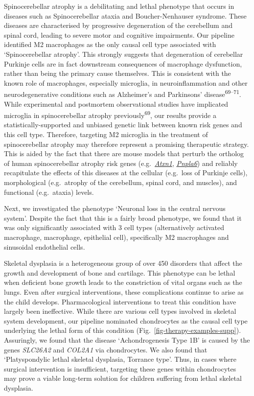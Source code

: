 \documentclass[
]{article}
\begin{document}
Spinocerebellar atrophy is a debilitating and lethal phenotype that
occurs in diseases such as Spinocerebellar ataxia and Boucher-Nenhauser
syndrome. These diseases are characterised by progressive degeneration
of the cerebellum and spinal cord, leading to severe motor and cognitive
impairments. Our pipeline identified M2 macrophages as the only causal
cell type associated with `Spinocerebellar atrophy'. This strongly
suggests that degeneration of cerebellar Purkinje cells are in fact
downstream consequences of macrophage dysfunction, rather than being the
primary cause themselves. This is consistent with the known role of
macrophages, especially microglia, in neuroinflammation and other
neurodegenerative conditions such as Alzheimer's and Parkinsons'
disease\textsuperscript{69--71}. While experimental and postmortem
observational studies have implicated microglia in spinocerebellar
atrophy previously\textsuperscript{69}, our results provide a
statistically-supported and unbiased genetic link between known risk
genes and this cell type. Therefore, targeting M2 microglia in the
treatment of spinocerebellar atrophy may therefore represent a promising
therapeutic strategy. This is aided by the fact that there are mouse
models that perturb the ortholog of human spinocerebellar atrophy risk
genes
(e.g.~\href{https://www.informatics.jax.org/marker/MGI:104783}{\emph{Atxn1}},
\href{https://www.informatics.jax.org/marker/MGI:1354723}{\emph{Pnpla6}})
and reliably recapitulate the effects of this diseases at the cellular
(e.g.~loss of Purkinje cells), morphological (e.g.~atrophy of the
cerebellum, spinal cord, and muscles), and functional (e.g.~ataxia)
levels.

Next, we investigated the phenotype `Neuronal loss in the central
nervous system'. Despite the fact that this is a fairly broad phenotype,
we found that it was only significantly associated with 3 cell types
(alternatively activated macrophage, macrophage, epithelial cell),
specifically M2 macrophages and sinusoidal endothelial cells.

Skeletal dysplasia is a heterogeneous group of over 450 disorders that
affect the growth and development of bone and cartilage. This phenotype
can be lethal when deficient bone growth leads to the constriction of
vital organs such as the lungs. Even after surgical interventions, these
complications continue to arise as the child develops. Pharmacological
interventions to treat this condition have largely been ineffective.
While there are various cell types involved in skeletal system
development, our pipeline nominated chondrocytes as the causal cell type
underlying the lethal form of this condition
(Fig.~\ref{fig-therapy-examples-supp}). Assuringly, we found that the
disease `Achondrogenesis Type 1B' is caused by the genes \emph{SLC26A2}
and \emph{COL2A1} via chondrocytes. We also found that `Platyspondylic
lethal skeletal dysplasia, Torrance type'. Thus, in cases where surgical
intervention is insufficient, targeting these genes within chondrocytes
may prove a viable long-term solution for children suffering from lethal
skeletal dysplasia.
\end{document}
